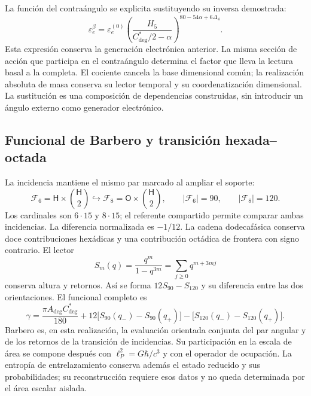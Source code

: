 La función del contraángulo se explicita sustituyendo su inversa demostrada:
\begin{equation}
 \boxed{\varepsilon_e^\beta=\varepsilon_e^{(0)}
 \left(\frac{H_5}{C^*_{\deg}/2-\alpha}\right)^{80-54\alpha+6\Delta_4}.}
 \label{md:compos:electron-contraangulo}
\end{equation}
Esta expresión conserva la generación electrónica anterior. La misma
sección de acción que participa en el contraángulo determina el factor que
lleva la lectura basal a la completa. El cociente cancela la base dimensional
común; la realización absoluta de masa conserva su lector temporal y su coordenatización
dimensional. La sustitución es una composición de dependencias construidas,
sin introducir un ángulo externo como generador electrónico.

\subsection{Funcional de Barbero y transición hexada--octada}
\label{md:compos:barbero}

La incidencia mantiene el mismo par marcado al ampliar el soporte:
\begin{equation}
 \mathcal F_6=\mathsf H\times\binom{\mathsf H}{2}
 \hookrightarrow
 \mathcal F_8=\mathsf O\times\binom{\mathsf H}{2},
 \qquad |\mathcal F_6|=90,\qquad |\mathcal F_8|=120.
 \label{md:compos:incidencia}
\end{equation}
Los cardinales son $6\cdot15$ y $8\cdot15$; el referente compartido permite
comparar ambas incidencias. La diferencia normalizada es $-1/12$. La cadena
dodecafásica conserva doce contribuciones hexádicas y una contribución
octádica de frontera con signo contrario. El lector
\begin{equation}
 S_m(q)=\frac{q^m}{1-q^{3m}}
 =\sum_{j\geq0}q^{m+3mj}
 \label{md:compos:serie-retorno}
\end{equation}
conserva altura y retornos. Así se forma $12S_{90}-S_{120}$ y su diferencia
entre las dos orientaciones. El funcional completo es
\begin{equation}
 \gamma=\frac{\pi A_{\deg}C^*_{\deg}}{180}
 +12\bigl[S_{90}(q_-)-S_{90}(q_+)\bigr]
 -\bigl[S_{120}(q_-)-S_{120}(q_+)\bigr].
 \label{md:compos:funcional-barbero}
\end{equation}
Barbero es, en esta realización, la evaluación orientada conjunta del par
angular y de los retornos de la transición de incidencias. Su participación
en la escala de área se compone después con $\ell_P^2=G\hbar/c^3$ y con el
operador de ocupación. La entropía de entrelazamiento conserva además el
estado reducido y sus probabilidades; su reconstrucción requiere esos datos
y no queda determinada por el área escalar aislada.

